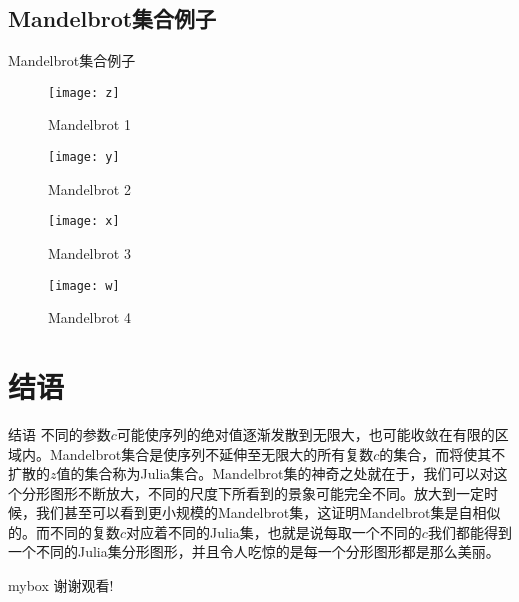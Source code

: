 \documentclass{beamer}
\begin{document}
\subsection{Mandelbrot集合例子}
\begin{frame}{Mandelbrot集合例子}
\begin{figure}[H]
  \centering
  \begin{minipage}[t]{0.48\textwidth}
    \centering
    \texttt{[image: z]}
    \caption{Mandelbrot 1}
  \end{minipage}
  \begin{minipage}[t]{0.48\textwidth}
    \centering
    \texttt{[image: y]}
    \caption{Mandelbrot 2}
  \end{minipage}
\end{figure}

\begin{figure}[H]
  \centering
  \begin{minipage}[t]{0.48\textwidth}
    \centering
    \texttt{[image: x]}
    \caption{Mandelbrot 3}
  \end{minipage}
  \begin{minipage}[t]{0.48\textwidth}
    \centering
    \texttt{[image: w]}
    \caption{Mandelbrot 4}
  \end{minipage}
\end{figure}
\end{frame}

\section{结语}
\begin{frame}{结语}
  不同的参数$c$可能使序列的绝对值逐渐发散到无限大，也可能收敛在有限的区域内。Mandelbrot集合是使序列不延伸至无限大的所有复数$c$的集合，而将使其不扩散的$z$值的集合称为Julia集合。Mandelbrot集的神奇之处就在于，我们可以对这个分形图形不断放大，不同的尺度下所看到的景象可能完全不同。放大到一定时候，我们甚至可以看到更小规模的Mandelbrot集，这证明Mandelbrot集是自相似的。而不同的复数$c$对应着不同的Julia集，也就是说每取一个不同的$c$我们都能得到一个不同的Julia集分形图形，并且令人吃惊的是每一个分形图形都是那么美丽。
\end{frame}

\begin{frame}
\begin{center}
\begin{minipage}{1\textwidth}
\begin{beamercolorbox}[wd=0.70\textwidth, rounded=true, shadow=true]{mybox}
  \LARGE \centering 谢谢观看! 
\end{beamercolorbox}
\end{minipage}
\end{center}
\end{frame}
\end{document}
